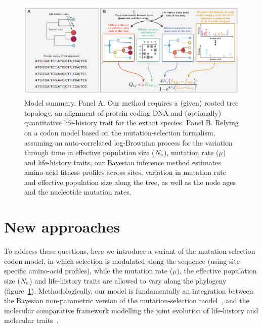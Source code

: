 \documentclass{article}
\begin{document}
\begin{figure}[t]
    \begin{center}
        \includegraphics[width=\textwidth] {model_summary.pdf}
    \end{center}
    \caption[Model summary]{
        Model summary.
        Panel A.
        Our method requires a (given) rooted tree topology, an alignment of protein-coding DNA and (optionally) quantitative life-history trait for the extant species.
        Panel B.
        Relying on a codon model based on the mutation-selection formalism, assuming an auto-correlated log-Brownian process for the variation through time in effective population size ($N_{\text{e}}$), mutation rate ($\mu$) and life-history traits, our Bayesian inference method estimates amino-acid fitness profiles across sites, variation in mutation rate and effective population size along the tree, as well as the node ages and the nucleotide mutation rates.}
    \label{fig:modelSummary}
\end{figure}

\section{New approaches}
\label{sec:NewApproaches}
To address these questions, here we introduce a variant of the mutation-selection {codon} model, in which selection is modulated along the sequence (using site-specific amino-acid profiles), while the mutation rate ($\mu$), the {effective population size} ($N_{\text{e}}$) and life-history traits are allowed to vary along the phylogeny (figure~\ref{fig:modelSummary}).
Methodologically, our model is fundamentally an integration between the Bayesian non-parametric version of the \citet{Halpern1998} mutation-selection model~\citep{Rodrigue2014}, and the molecular comparative framework modelling the joint evolution of life-history and molecular traits~\citep{Lartillot2011}.
\end{document}
